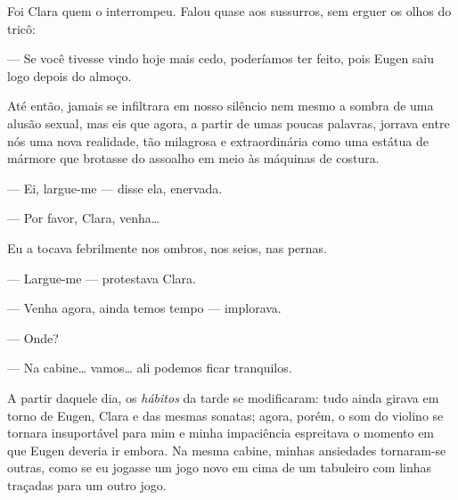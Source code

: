 Foi Clara quem o interrompeu. Falou quase aos sussurros, sem erguer os olhos
do tricô:

--- Se você tivesse vindo hoje mais cedo, poderíamos ter feito, pois Eugen
    saiu logo depois do almoço.

Até então, jamais se infiltrara em nosso silêncio nem mesmo a sombra de uma
alusão sexual, mas eis que agora, a partir de umas poucas palavras, jorrava
entre nós uma nova realidade, tão milagrosa e extraordinária como uma estátua
de mármore que brotasse do assoalho em meio às máquinas de costura.


--- Ei, largue-me --- disse ela, enervada.

--- Por favor, Clara, venha\ldots{}


Eu a tocava febrilmente nos ombros, nos seios, nas pernas.

--- Largue-me --- protestava Clara.

--- Venha agora, ainda temos tempo --- implorava.

--- Onde?

--- Na cabine\ldots{} vamos\ldots{} ali podemos ficar tranquilos.


A partir daquele dia, os \textit{hábitos} da tarde se modificaram: tudo ainda
girava em torno de Eugen, Clara e das mesmas sonatas; agora, porém, o som do
violino se tornara insuportável para mim e minha impaciência espreitava o
momento em que Eugen deveria ir embora. Na mesma cabine, minhas ansiedades
tornaram-se outras, como se eu jogasse um jogo novo em cima de um tabuleiro
com linhas traçadas para um outro jogo. 



